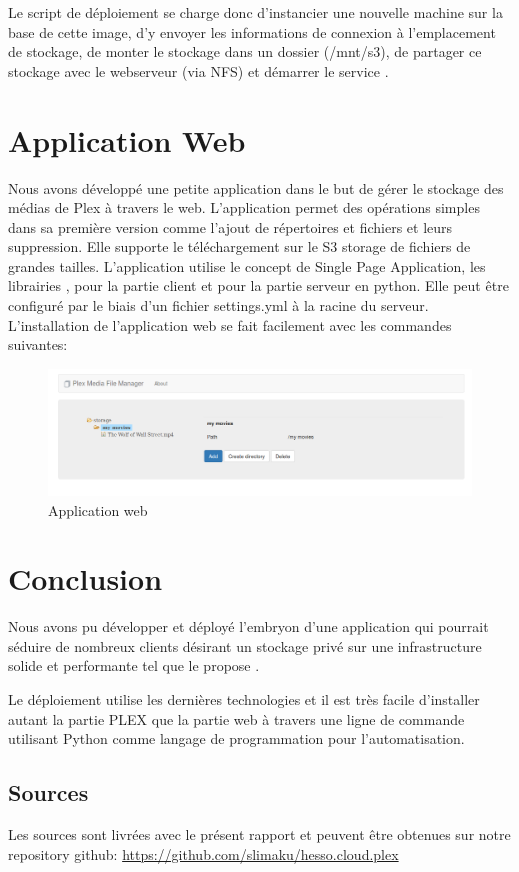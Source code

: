 \documentclass[french]{msereport}
\newcommand{\aws}{\brand{Amazon Web Services}}
\newcommand{\plex}{\brand{PLEX}}
\begin{document}
		Le script de déploiement se charge donc d’instancier une nouvelle machine sur la base de cette image, d’y envoyer les informations de connexion à l’emplacement de stockage, de monter le stockage dans un dossier (/mnt/s3), de partager ce stockage avec le webserveur (via NFS) et démarrer le service \plex.
	
	\section{Application Web}
		Nous avons développé une petite application dans le but de gérer le stockage des médias de Plex à travers le web. L’application permet des opérations simples dans sa première version comme l’ajout de répertoires et fichiers et leurs suppression. Elle supporte le téléchargement sur le S3 storage de fichiers de grandes tailles.
		L’application utilise le concept de Single Page Application, les librairies ,  pour la partie client et  pour la partie serveur en python.
		Elle peut être configuré par le biais d’un fichier settings.yml à la racine du serveur. L’installation de l’application web se fait facilement avec les commandes suivantes:
				
		
		\begin{figure}[h]
			\label{webserver}
			\includegraphics[width=\textwidth]{screen_webserver.png}
			\caption{Application web}
		\end{figure}
		
	
	\section{Conclusion}
		Nous avons pu développer et déployé l'embryon d’une application qui pourrait séduire de nombreux clients désirant un stockage privé sur une infrastructure solide et performante tel que le propose \aws.
		
		Le déploiement utilise les dernières technologies et il est très facile d’installer autant la partie PLEX que la partie web à travers une ligne de commande utilisant Python comme langage de programmation pour l’automatisation.
			
	
	\appendixsection
	
		\listoffigures
		
		\subsection{Sources}
			Les sources sont livrées avec le présent rapport et peuvent être obtenues sur notre repository github: \url{https://github.com/slimaku/hesso.cloud.plex}
		
\end{document}
